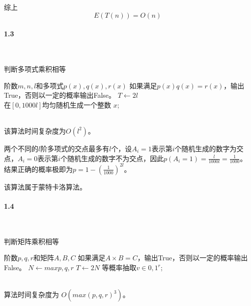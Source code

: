 综上 $$E(T(n)) = O(n)$$

\paragraph{1.3}~{}
\begin{algorithm}[H]  
    \caption{判断多项式乘积相等}  
    \begin{algorithmic}[1]
        \Require 阶数$m,n,l$和多项式$p(x),q(x),r(x)$
        \Ensure 如果满足$p(x)q(x)=r(x)$，输出True，否则以一定的概率输出False。
        \State $T \leftarrow 2l$
         \\
        \EndIf
            在$[0,1000l]$均匀随机生成一个整数 $x$;
             \\
            \EndIf
        \EndFor \\
    \end{algorithmic}
\end{algorithm}  

该算法时间复杂度为$O(l^2)$。

两个不同的$l$阶多项式的交点最多有$l$个，设$A_{i}=1$表示第$i$个随机生成的数字为交点，$A_{i}=0$表示第$i$个随机生成的数字不为交点，因此$p(A_{i}=1)=\frac{l}{1000l}=\frac{1}{1000}$。
结果正确的概率极即为$p=1-(\frac{1}{1000})^{2l}$。

该算法属于蒙特卡洛算法。

\paragraph{1.4}~{}
\begin{algorithm}[H]  
    \caption{判断矩阵乘积相等}  
    \begin{algorithmic}[1]
        \Require 阶数$p,q,r$和矩阵$A,B,C$
        \Ensure 如果满足$A \times B = C$，输出True，否则以一定的概率输出False。
        \State $N \leftarrow max{p,q,r}$
        \State $T \leftarrow 2N$
            等概率抽取$v \in {0,1}^r$;
             \\
            \EndIf
        \EndFor \\
    \end{algorithmic}
\end{algorithm}  

算法时间复杂度为 $O(max(p,q,r)^3)$。

